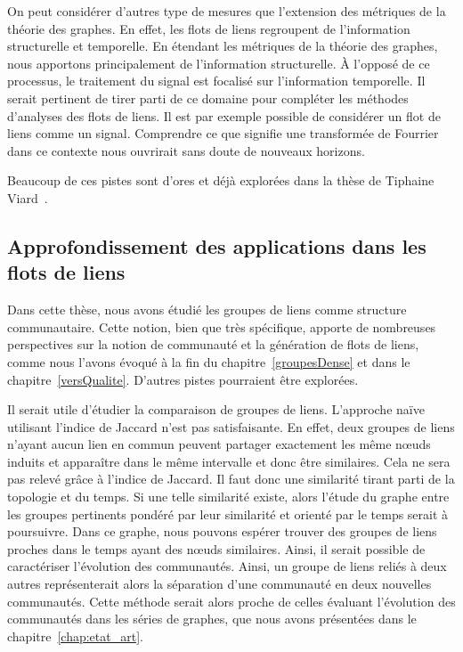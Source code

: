 \bigskip

On peut considérer d'autres type de mesures que l'extension des métriques de la théorie des graphes.
En effet, les flots de liens regroupent de l'information structurelle et temporelle.
En étendant les métriques de la théorie des graphes, nous apportons principalement de l'information structurelle.
\`A l'opposé de ce processus, le traitement du signal est focalisé sur l'information temporelle.
Il serait pertinent de tirer parti de ce domaine pour compléter les méthodes d'analyses des flots de liens.
Il est par exemple possible de considérer un flot de liens comme un signal.
Comprendre ce que signifie une transformée de Fourrier dans ce contexte nous ouvrirait sans doute de nouveaux horizons.

\bigskip

Beaucoup de ces pistes sont d'ores et déjà explorées dans la thèse de Tiphaine Viard~\cite{viard2016flots}.

\subsection{Approfondissement des applications dans les flots de liens}
Dans cette thèse, nous avons étudié les groupes de liens comme structure communautaire.
Cette notion, bien que très spécifique, apporte de nombreuses perspectives sur la notion de communauté et la génération de flots de liens, comme nous l'avons évoqué à la fin du chapitre~\ref{groupesDense} et dans le chapitre~\ref{versQualite}.
D'autres pistes pourraient être explorées.

\bigskip

Il serait utile d'étudier la comparaison de groupes de liens.
L'approche naïve utilisant l'indice de Jaccard n'est pas satisfaisante.
En effet, deux groupes de liens n'ayant aucun lien en commun peuvent partager exactement les même n\oe{}uds induits et apparaître dans le même intervalle et donc être similaires.
Cela ne sera pas relevé grâce à l'indice de Jaccard.
Il faut donc une similarité tirant parti de la topologie et du temps.
Si une telle similarité existe, alors l'étude du graphe entre les groupes pertinents pondéré par leur similarité et orienté par le temps serait à poursuivre.
Dans ce graphe, nous pouvons espérer trouver des groupes de liens proches dans le temps ayant des n\oe{}uds similaires.
Ainsi, il serait possible de caractériser l'évolution des communautés.
Ainsi, un groupe de liens reliés à deux autres représenterait alors la séparation d'une communauté en deux nouvelles communautés.
Cette méthode serait alors proche de celles évaluant l'évolution des communautés dans les séries de graphes, que nous avons présentées dans le chapitre~\ref{chap:etat_art}.

